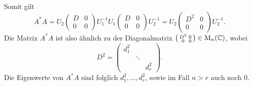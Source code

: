 Somit gilt
\[
    A^* A
  = U_2
    \begin{pmatrix}
      D & 0 \\
      0 & 0
    \end{pmatrix}
    U_1^{-1}
    U_1
    \begin{pmatrix}
      D & 0 \\
      0 & 0
    \end{pmatrix}
    U_2^{-1}
  = U_2
    \begin{pmatrix}
      D^2 & 0 \\
      0   & 0
    \end{pmatrix}
    U_2^{-1}.
\]
Die Matrix $A^* A$ ist also ähnlich zu der Diagonalmatrix $\begin{psmallmatrix} D^2 & 0 \\ 0 & 0 \end{psmallmatrix} \in \operatorname{M}_{n}(\mathbb{C})$, wobei
\[
    D^2
  = \begin{pmatrix}
      d_1^2 &         &       \\
            & \ddots  &       \\
            &         & d_r^2
    \end{pmatrix}.
\]
Die Eigenwerte von $A^* A$ sind folglich $d_1^2, \dotsc, d_r^2$, sowie im Fall $n > r$ auch noch $0$.






